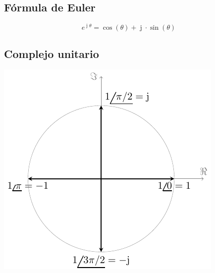 \documentclass[article, a4paper]{memoir}
\DeclareMathOperator{\ji}{\mathrm{j}}
\begin{document}
\subsection{Fórmula de Euler}

\vspace{-3mm}
\begin{equation*}
    e^{\ji \theta} = \cos(\theta)+\ji\cdot\sin(\theta)
\end{equation*}

\vspace{-2mm}
\subsection{Complejo unitario}

\vspace{2mm}
\begin{minipage}{0.4\linewidth}
  \hspace{-5mm}\includegraphics{../figs/circulo}
\end{minipage}
\end{document}
